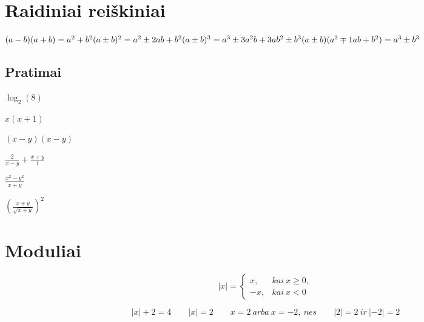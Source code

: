 \documentclass[fleqn]{article} %
\newenvironment{exercises}{\begin{enumerate*}[label=\alph*), itemjoin=\qquad]}{\end{enumerate*}}
\begin{document}
\section{Raidiniai reiškiniai}

\begin{math}
    (a - b)(a + b) = a^2 + b^2 \\
    (a \pm b)^2 = a^2 \pm 2ab + b^2 \\
    (a \pm b)^3 = a^3 \pm 3a^2b + 3ab^2 \pm b^3 \\
    (a \pm b)(a^2 \mp 1ab + b^2) = a^3 \pm b^3
\end{math}

\subsection{Pratimai}

\begin{exercises}
    \item $\log_2(8)                         $
    \item $x(x + 1)                          $
    \item $(x - y)(x - y)                    $
    \item $\frac{2}{x - y} + \frac{x + y}{1} $
    \item $\frac{x^2 - y^2}{x + y}           $
    \item $(\frac{x + y}{\sqrt{x + y}})^2$
\end{exercises} 

\section{Moduliai}

\[
|x| =
\begin{cases}
    x,  &kai\ x \ge 0, \\
    -x, &kai\ x < 0
\end{cases}     
\]

\[
|x| + 2 = 4 \qquad
|x| = 2     \qquad
x = 2\ arba\ x = -2,\ nes \qquad
|2| = 2\ ir\ |-2| = 2
\]
\end{document}
